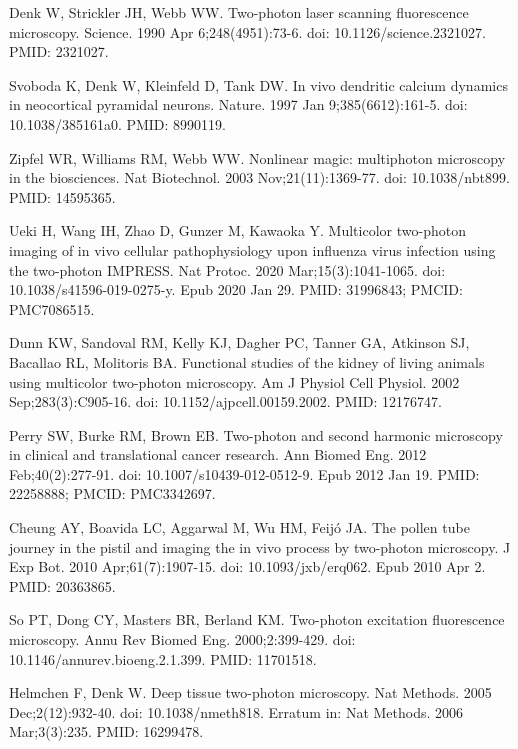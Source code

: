 \documentclass[10pt,letterpaper]{article}
\begin{document}
\nolinenumbers

\begin{thebibliography}{10}

Denk W, Strickler JH, Webb WW. Two-photon laser scanning fluorescence microscopy. Science. 1990 Apr 6;248(4951):73-6. doi: 10.1126/science.2321027. PMID: 2321027.

Svoboda K, Denk W, Kleinfeld D, Tank DW. In vivo dendritic calcium dynamics in neocortical pyramidal neurons. Nature. 1997 Jan 9;385(6612):161-5. doi: 10.1038/385161a0. PMID: 8990119.

Zipfel WR, Williams RM, Webb WW. Nonlinear magic: multiphoton microscopy in the biosciences. Nat Biotechnol. 2003 Nov;21(11):1369-77. doi: 10.1038/nbt899. PMID: 14595365.

Ueki H, Wang IH, Zhao D, Gunzer M, Kawaoka Y. Multicolor two-photon imaging of in vivo cellular pathophysiology upon influenza virus infection using the two-photon IMPRESS. Nat Protoc. 2020 Mar;15(3):1041-1065. doi: 10.1038/s41596-019-0275-y. Epub 2020 Jan 29. PMID: 31996843; PMCID: PMC7086515.

Dunn KW, Sandoval RM, Kelly KJ, Dagher PC, Tanner GA, Atkinson SJ, Bacallao RL, Molitoris BA. Functional studies of the kidney of living animals using multicolor two-photon microscopy. Am J Physiol Cell Physiol. 2002 Sep;283(3):C905-16. doi: 10.1152/ajpcell.00159.2002. PMID: 12176747.

Perry SW, Burke RM, Brown EB. Two-photon and second harmonic microscopy in clinical and translational cancer research. Ann Biomed Eng. 2012 Feb;40(2):277-91. doi: 10.1007/s10439-012-0512-9. Epub 2012 Jan 19. PMID: 22258888; PMCID: PMC3342697.

Cheung AY, Boavida LC, Aggarwal M, Wu HM, Feijó JA. The pollen tube journey in the pistil and imaging the in vivo process by two-photon microscopy. J Exp Bot. 2010 Apr;61(7):1907-15. doi: 10.1093/jxb/erq062. Epub 2010 Apr 2. PMID: 20363865.

So PT, Dong CY, Masters BR, Berland KM. Two-photon excitation fluorescence microscopy. Annu Rev Biomed Eng. 2000;2:399-429. doi: 10.1146/annurev.bioeng.2.1.399. PMID: 11701518.

Helmchen F, Denk W. Deep tissue two-photon microscopy. Nat Methods. 2005 Dec;2(12):932-40. doi: 10.1038/nmeth818. Erratum in: Nat Methods. 2006 Mar;3(3):235. PMID: 16299478.


\end{thebibliography}
\end{document}
